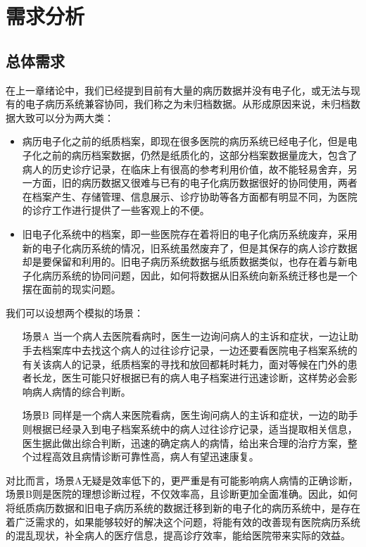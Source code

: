\chapter{需求分析}
\label{chap:requirements-analysis}

\section{总体需求}
在上一章绪论中，我们已经提到目前有大量的病历数据并没有电子化，或无法与现有的电子病历系统兼容协同，我们称之为未归档数据。从形成原因来说，未归档数据大致可以分为两大类：
\begin{itemize}
	\item 病历电子化之前的纸质档案，即现在很多医院的病历系统已经电子化，但是电子化之前的病历档案数据，仍然是纸质化的，这部分档案数据量庞大，包含了病人的历史诊疗记录，在临床上有很高的参考利用价值，故不能轻易舍弃，另一方面，旧的病历数据又很难与已有的电子化病历数据很好的协同使用，两者在档案产生、存储管理、信息展示、诊疗协助等各方面都有明显不同，为医院的诊疗工作进行提供了一些客观上的不便。
	\item 旧电子化系统中的档案，即一些医院存在着将旧的电子化病历系统废弃，采用新的电子化病历系统的情况，旧系统虽然废弃了，但是其保存的病人诊疗数据却是要保留和利用的。旧电子病历系统数据与纸质数据类似，也存在着与新电子化病历系统的协同问题，因此，如何将数据从旧系统向新系统迁移也是一个摆在面前的现实问题。
\end{itemize}
我们可以设想两个模拟的场景：
\begin{itemize}
	\item[场景A] 当一个病人去医院看病时，医生一边询问病人的主诉和症状，一边让助手去档案库中去找这个病人的过往诊疗记录，一边还要看医院电子档案系统的有关该病人的记录，纸质档案的寻找和放回都耗时耗力，面对等候在门外的患者长龙，医生可能只好根据已有的病人电子档案进行迅速诊断，这样势必会影响病人病情的综合判断。
	\item[场景B] 同样是一个病人来医院看病，医生询问病人的主诉和症状，一边的助手则根据已经录入到电子档案系统中的病人过往诊疗记录，适当提取相关信息，医生据此做出综合判断，迅速的确定病人的病情，给出来合理的治疗方案，整个过程高效且病情诊断可靠性高，病人有望迅速康复。
\end{itemize}
对比而言，场景A无疑是效率低下的，更严重是有可能影响病人病情的正确诊断，场景B则是医院的理想诊断过程，不仅效率高，且诊断更加全面准确。因此，如何将纸质病历数据和旧电子病历系统的数据迁移到新的电子化的病历系统中，是存在着广泛需求的，如果能够较好的解决这个问题，将能有效的改善现有医院病历系统的混乱现状，补全病人的医疗信息，提高诊疗效率，能给医院带来实际的效益。

